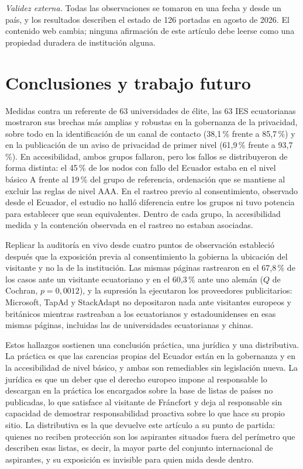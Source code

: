 \documentclass[pdflatex,sn-basic,Numbered]{sn-jnl}
\theoremstyle{thmstyleone}
\theoremstyle{thmstyletwo}
\theoremstyle{thmstylethree}
\begin{document}
\emph{Validez externa.} Todas las observaciones se tomaron en una fecha y desde un pa\'is, y los resultados describen el estado de 126 portadas en agosto de 2026. El contenido web cambia; ninguna afirmaci\'on de este art\'iculo debe leerse como una propiedad duradera de instituci\'on alguna.

\section{Conclusiones y trabajo futuro}\label{sec:conclusions}

Medidas contra un referente de 63 universidades de \'elite, las 63 IES ecuatorianas mostraron sus brechas m\'as amplias y robustas en la gobernanza de la privacidad, sobre todo en la identificaci\'on de un canal de contacto (38,1\,\% frente a 85,7\,\%) y en la publicaci\'on de un aviso de privacidad de primer nivel (61,9\,\% frente a 93,7\,\%). En accesibilidad, ambos grupos fallaron, pero los fallos se distribuyeron de forma distinta: el 45\,\% de los nodos con fallo del Ecuador estaba en el nivel b\'asico A frente al 19\,\% del grupo de referencia, ordenaci\'on que se mantiene al excluir las reglas de nivel AAA. En el rastreo previo al consentimiento, observado desde el Ecuador, el estudio no hall\'o diferencia entre los grupos ni tuvo potencia para establecer que sean equivalentes. Dentro de cada grupo, la accesibilidad medida y la contenci\'on observada en el rastreo no estaban asociadas.

Replicar la auditor\'ia en vivo desde cuatro puntos de observaci\'on estableci\'o despu\'es que la exposici\'on previa al consentimiento la gobierna la ubicaci\'on del visitante y no la de la instituci\'on. Las mismas p\'aginas rastrearon en el 67,8\,\% de los casos ante un visitante ecuatoriano y en el 60,3\,\% ante uno alem\'an ($Q$ de Cochran, $p=0{,}0012$), y la supresi\'on la ejecutaron los proveedores publicitarios: Microsoft, TapAd y StackAdapt no depositaron nada ante visitantes europeos y brit\'anicos mientras rastreaban a los ecuatorianos y estadounidenses en esas mismas p\'aginas, incluidas las de universidades ecuatorianas y chinas.

Estos hallazgos sostienen una conclusi\'on pr\'actica, una jur\'idica y una distributiva. La pr\'actica es que las carencias propias del Ecuador est\'an en la gobernanza y en la accesibilidad de nivel b\'asico, y ambas son remediables sin legislaci\'on nueva. La jur\'idica es que un deber que el derecho europeo impone al responsable lo descargan en la pr\'actica los encargados sobre la base de listas de pa\'ises no publicadas, lo que satisface al visitante de Fr\'ancfort y deja al responsable sin capacidad de demostrar responsabilidad proactiva sobre lo que hace su propio sitio. La distributiva es la que devuelve este art\'iculo a su punto de partida: quienes no reciben protecci\'on son los aspirantes situados fuera del per\'imetro que describen esas listas, es decir, la mayor parte del conjunto internacional de aspirantes, y su exposici\'on es invisible para quien mida desde dentro.
\end{document}
